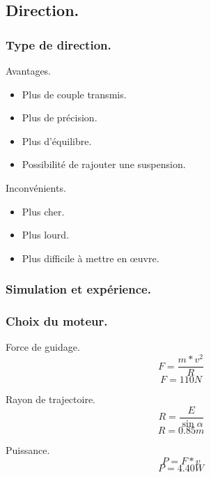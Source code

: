 \subsection{Direction.}
\begin{frame}
    \frametitle{Type de direction.}
    \begin{exampleblock}{Avantages.}
        \begin{itemize}
            \item Plus de couple transmis.
            \item Plus de précision.
            \item Plus d'équilibre.
            \item Possibilité de rajouter une suspension.
        \end{itemize}
    \end{exampleblock}
     {
        \begin{alertblock}{Inconvénients.}
            \begin{itemize}
                \item Plus cher.
                \item Plus lourd.
                \item Plus difficile à mettre en œuvre.
            \end{itemize}
        \end{alertblock}
    }
\end{frame}

\begin{frame}
    \frametitle{Simulation et expérience.}
\end{frame}

\begin{frame}
    \frametitle{Choix du moteur.}
    \begin{block}{Force de guidage.}
        \[ F = \frac{m*v^2}{R} \]
        \[ F = 110 N \]
    \end{block}
     {
        \begin{block}{Rayon de trajectoire.}
            \[ R = \frac{E}{\sin \alpha} \]
            \[ R = 0.85m \]
        \end{block}
    }
     {
        \begin{block}{Puissance.}
            \[ P = F * v \]
            \[ P = 4.40W \]
        \end{block}
    }
\end{frame}


